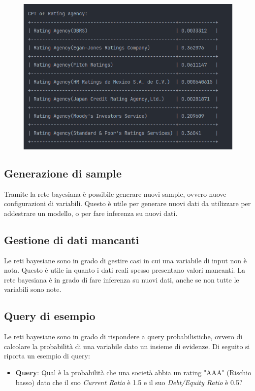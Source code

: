 \begin{figure}[H]
    \centering
    \includegraphics[scale=0.6]{img/cpt.png}
\end{figure}

\subsection{Generazione di sample}
\noindent Tramite la rete bayesiana è possibile generare nuovi sample, ovvero nuove configurazioni di variabili. Questo è utile per generare nuovi dati da utilizzare per addestrare un modello, o per fare inferenza su nuovi dati. 


\subsection{Gestione di dati mancanti}

\noindent Le reti bayesiane sono in grado di gestire casi in cui una variabile di input non è nota. Questo è utile in quanto i dati reali spesso presentano valori mancanti. La rete bayesiana è in grado di fare inferenza su nuovi dati, anche se non tutte le variabili sono note.


\subsection{Query di esempio}
\noindent Le reti bayesiane sono in grado di rispondere a query probabilistiche, ovvero di calcolare la probabilità di una variabile dato un insieme di evidenze. Di seguito si riporta un esempio di query:
\begin{itemize}[label=-]
    \item \textbf{Query}: Qual è la probabilità che una società abbia un rating "AAA" (Rischio basso) dato che il suo \textit{Current Ratio} è 1.5 e il suo \textit{Debt/Equity Ratio} è 0.5?
\end{itemize}